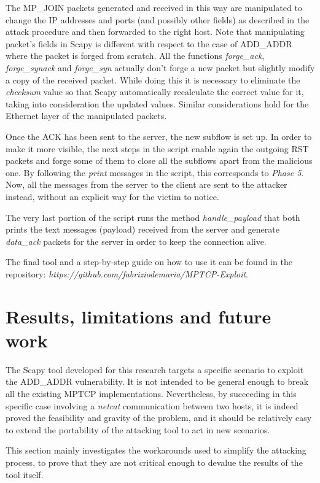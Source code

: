 The MP\_JOIN packets generated and received in this way are manipulated to change the IP addresses and ports (and possibly other fields) as described in the attack procedure and then forwarded to the right host. Note that manipulating packet's fields in Scapy is different with respect to the case of ADD\_ADDR where the packet is forged from scratch. All the functions \textit{forge\_ack}, \textit{forge\_synack} and \textit{forge\_syn} actually don't forge a new packet but slightly modify a copy of the received packet. While doing this it is necessary to eliminate the \textit{checksum} value so that Scapy automatically recalculate the correct value for it, taking into consideration the updated values. Similar considerations hold for the Ethernet layer of the manipulated packets. 

Once the ACK has been sent to the server, the new subflow is set up. In order to make it more visible, the next steps in the script enable again the outgoing RST packets and forge some of them to close all the subflows apart from the malicious one. By following the \textit{print} messages in the script, this corresponds to \textit{Phase 5}. Now, all the messages from the server to the client are sent to the attacker instead, without an explicit way for the victim to notice. 

The very last portion of the script runs the method \textit{handle\_payload} that both prints the text messages (payload) received from the server and generate \textit{data\_ack} packets for the server in order to keep the connection alive. 

The final tool and a step-by-step guide on how to use it can be found in the repository: \textit{https://github.com/fabriziodemaria/MPTCP-Exploit}.

\section{Results, limitations and future work} \label{limitationsandfuturework}
The Scapy tool developed for this research targets a specific scenario to exploit the ADD\_ADDR vulnerability. It is not intended to be general enough to break all the existing MPTCP implementations. Nevertheless, by succeeding in this specific case involving a \textit{netcat} communication between two hosts, it is indeed proved the feasibility and gravity of the problem, and it should be relatively easy to extend the portability of the attacking tool to act in new scenarios. 

This section mainly investigates the workarounds used to simplify the attacking process, to prove that they are not critical enough to devalue the results of the tool itself.

